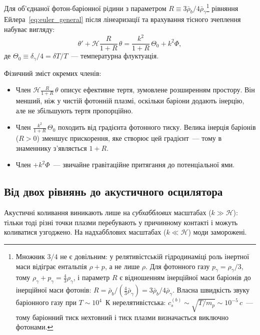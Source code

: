 Для об'єднаної фотон-баріонної рідини з параметром
$R \equiv 3\bar\rho_b/4\bar\rho_\gamma$\footnote{%
Множник $3/4$ не є довільним: у релятивістській
гідродинаміці роль інертної маси відіграє ентальпія
$\rho + p$, а не лише $\rho$. Для фотонного газу
$p_\gamma = \rho_\gamma/3$, тому
$\rho_\gamma + p_\gamma = \tfrac{4}{3}\rho_\gamma$,
і параметр $R$ є відношенням інерційної маси баріонів
до інерційної маси фотонів:
$R = \bar\rho_b / (\tfrac{4}{3}\bar\rho_\gamma)
   = 3\bar\rho_b / 4\bar\rho_\gamma$.
Власна швидкість звуку баріонного газу при
$T \sim 10^4$~К нерелятивістська:
$c_s^{(b)} \sim \sqrt{T/m_p} \sim 10^{-5}\,c$~---
тому баріонний тиск нехтовний і тиск плазми
визначається виключно фотонами.%
}
рівняння Ейлера~\eqref{eq:euler_general} після лінеаризації
та врахування тісного зчеплення набуває вигляду:
\begin{equation}\label{eq:euler_photon_baryon}
  \theta' + \mathcal{H}\frac{R}{1+R}\,\theta
  = \frac{k^2}{1+R}\,\Theta_0 + k^2\Phi,
\end{equation}
де $\Theta_0 \equiv \delta_\gamma/4 = \delta T/T$~---
температурна флуктуація.

Фізичний зміст окремих членів:
\begin{itemize}
  \item Член $\mathcal{H}\frac{R}{1+R}\,\theta$ описує
        ефективне тертя, зумовлене розширенням простору.
        Він менший, ніж у чистій фотонній плазмі,
        оскільки баріони додають інерцію, але не
        збільшують тертя пропорційно.
  \item Член $\frac{k^2}{1+R}\,\Theta_0$ походить від
        градієнта фотонного тиску. Велика інерція
        баріонів ($R>0$) зменшує прискорення, яке
        створює цей градієнт~--- тому в знаменнику
        з'являється $1+R$.
  \item Член $+k^2\Phi$~--- звичайне гравітаційне
        притягання до потенціальної ями.
\end{itemize}

\subsection*{Від двох рівнянь до акустичного осцилятора}

Акустичні коливання виникають лише на \emph{субхабблових}
масштабах ($k \gg \mathcal{H}$): тільки тоді різні точки
плазми перебувають у причинному контакті і можуть
коливатися узгоджено. На надхабблових масштабах
($k \ll \mathcal{H}$) моди заморожені.

